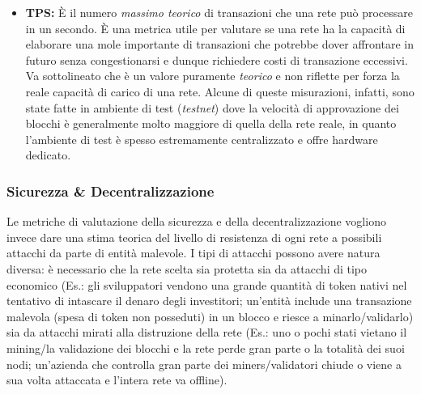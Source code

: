 \documentclass[a4paper, 12pt]{article}
\begin{document}
\begin{itemize}
\item \textbf{TPS: }
È il numero \textit{massimo teorico} di transazioni che una rete può processare in un secondo.
È una metrica utile per valutare se una rete ha la capacità di elaborare una mole importante di transazioni che potrebbe dover affrontare in futuro senza
congestionarsi e dunque richiedere costi di transazione eccessivi.
Va sottolineato che è un valore puramente \textit{teorico} e non riflette per forza la reale capacità di carico di una rete.
Alcune di queste misurazioni, infatti, sono state fatte in ambiente di test (\textit{testnet}) dove la velocità di approvazione dei blocchi è
generalmente molto maggiore di quella della rete reale, in quanto l'ambiente di test è spesso estremamente centralizzato e offre hardware dedicato.

\end{itemize}

\newpage

\subsubsection*{Sicurezza \& Decentralizzazione}
Le metriche di valutazione della sicurezza e della decentralizzazione vogliono invece dare una stima teorica del livello di resistenza di ogni rete a possibili attacchi da parte di entità
malevole. I tipi di attacchi possono avere natura diversa: è necessario che la rete scelta sia protetta sia da attacchi di tipo economico (Es.: gli sviluppatori vendono una grande quantità
di token nativi nel tentativo di intascare il denaro degli investitori; un'entità include una transazione malevola (spesa
di token non posseduti) in un blocco e riesce a minarlo/validarlo) sia da attacchi mirati alla distruzione della rete (Es.: uno o pochi stati vietano il mining/la validazione dei blocchi
e la rete perde gran parte o la totalità dei suoi nodi; un'azienda che controlla gran parte dei miners/validatori chiude o viene a sua volta attaccata e l'intera rete va offline).
\end{document}
